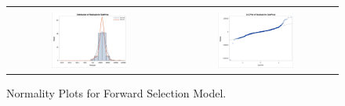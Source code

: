 \documentclass[11pt]{scrartcl} %
\begin{document}
\begin{figure}[H] %
	\centering
	\begin{tabular}{p{} p{}}
\hline	
	\multicolumn{1}{|c}{} &  \multicolumn{1}{c|}{} \\
		\multicolumn{1}{|c}{\includegraphics[width=0.48\textwidth]{../graphics/A2FWHist}} &
		\multicolumn{1}{c|}{\includegraphics[width=0.48\textwidth]{../graphics/A2FWqq}}\\
		\hline
	\end{tabular}		
	\caption{Normality Plots for Forward Selection Model.} %
	\label{fig:A2FWQQ}
\end{figure}
\end{document}
